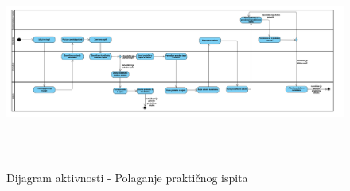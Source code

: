 \begin{figure}[H]
  \begin{center}
      \includegraphics[width=170mm, height=70mm]{Diagrams/dijagram_aktivnosti_polaganje_prakticnog_ispita.png}
  \end{center}
  \caption {Dijagram aktivnosti - Polaganje praktičnog ispita}
  \label{activity_polaganje_praktičnog_ispita}

\end{figure}
